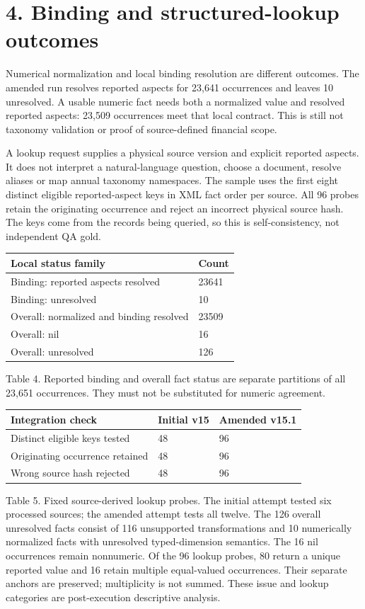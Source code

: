 \documentclass[10pt,a4paper]{article}
\begin{document}
\clearpage
\section*{4. Binding and structured-lookup outcomes}
Numerical normalization and local binding resolution are different outcomes. The amended run resolves reported aspects for 23,641 occurrences and leaves 10 unresolved. A usable numeric fact needs both a normalized value and resolved reported aspects: 23,509 occurrences meet that local contract. This is still not taxonomy validation or proof of source-defined financial scope.

A lookup request supplies a physical source version and explicit reported aspects. It does not interpret a natural-language question, choose a document, resolve aliases or map annual taxonomy namespaces. The sample uses the first eight distinct eligible reported-aspect keys in XML fact order per source. All 96 probes retain the originating occurrence and reject an incorrect physical source hash. The keys come from the records being queried, so this is self-consistency, not independent QA gold.

\begin{longtable}{@{}p{}p{}@{}}\toprule
\textbf{Local status family} & \textbf{Count} \\ \midrule\endhead
Binding: reported aspects resolved & 23641 \\
Binding: unresolved & 10 \\
Overall: normalized and binding resolved & 23509 \\
Overall: nil & 16 \\
Overall: unresolved & 126 \\
\bottomrule\end{longtable}
{\small Table 4. Reported binding and overall fact status are separate partitions of all 23,651 occurrences. They must not be substituted for numeric agreement.}
\begin{longtable}{@{}p{}p{}p{}@{}}\toprule
\textbf{Integration check} & \textbf{Initial v15} & \textbf{Amended v15.1} \\ \midrule\endhead
Distinct eligible keys tested & 48 & 96 \\
Originating occurrence retained & 48 & 96 \\
Wrong source hash rejected & 48 & 96 \\
\bottomrule\end{longtable}
{\small Table 5. Fixed source-derived lookup probes. The initial attempt tested six processed sources; the amended attempt tests all twelve.}
The 126 overall unresolved facts consist of 116 unsupported transformations and 10 numerically normalized facts with unresolved typed-dimension semantics. The 16 nil occurrences remain nonnumeric. Of the 96 lookup probes, 80 return a unique reported value and 16 retain multiple equal-valued occurrences. Their separate anchors are preserved; multiplicity is not summed. These issue and lookup categories are post-execution descriptive analysis.
\end{document}

